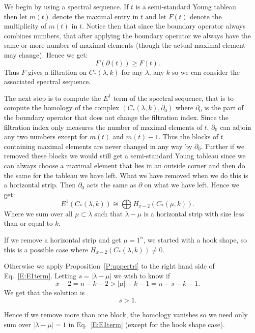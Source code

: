 \documentclass{elsart}
\begin{document}
\begin{pf}
  We begin by using a spectral sequence. If $t$ is a semi-standard Young tableau then let $m(t)$ denote the maximal entry
  in $t$ and let $F(t)$ denote the multiplicity of $m(t)$
  in $t$. Notice then that since the boundary operator always combines numbers, that after applying
  the boundary operator we always have the same or more number of maximal elements (though the actual maximal element 
  may change).
  Hence we get:  $$F(\partial(t)) \ge F(t).$$  Thus $F$ gives a filtration on $C_*(\lambda, k)$ for any $\lambda$, any $k$ so
  we can consider the associated spectral sequence. 

  The next step is to compute the $E^1$ term of the spectral sequence, that is to compute the homology of the complex
  $(C_*(\lambda, k), \partial_0)$ where $\partial_0$ is the part of the boundary operator that does not change the 
  filtration index. Since the filtration index only measures the number of maximal elements of $t$, $\partial_0$ can adjoin
  any two numbers except for $m(t)$ and $m(t)-1$. Thus the blocks of $t$ containing maximal elements are never
  changed in any way by $\partial_0$. Further if we removed these blocks we would still get a semi-standard Young tableau
  since we can always choose a maximal element that lies in an outside corner and then do the same for the tableau we 
  have left. What we have removed when we do this is a horizontal strip. Then $\partial_0$ acts the same as $\partial$ on 
  what we have left. Hence we get:
  \begin{equation}\label{E:E1term}
    E^1(C_*(\lambda, k)) \cong \bigoplus H_{x-2}(C_*(\mu, k)).
  \end{equation}
  Where we sum over all $\mu \subset \lambda$ such that $\lambda - \mu$ is a horizontal strip with size less than or equal to $k$.

  If we remove a horizontal 
  strip and get $ \mu =1^n$, we started with a hook shape, so this is a possible case where $H_{x-2}(C_*(\lambda,k)) \ne 0$.

  Otherwise we apply Proposition~\ref{P:uppertri} to the right hand side of Eq.~\ref{E:E1term}. Letting $s=|\lambda - \mu|$
  we wish to know if 
  $$ x-2=n-k-2 >|\mu| -k -1=n-s-k-1.$$ We get that the solution is $$s > 1.$$ 

  Hence if we remove more than one block, the
  homology vanishes so we need only sum over $|\lambda - \mu| = 1$ in Eq.~\ref{E:E1term} (except for the hook  
  shape case). 


\end{pf}
\end{document}
